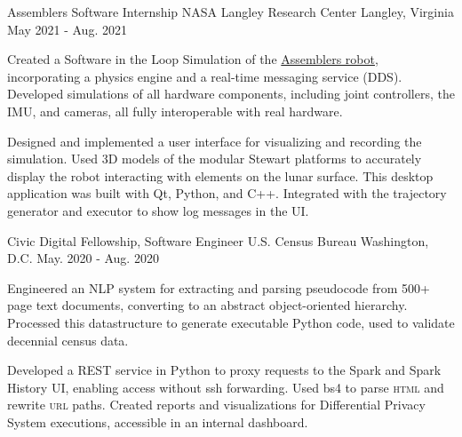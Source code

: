 

\begin{cventries}

  \cventry
  {Assemblers Software Internship} %
  {NASA Langley Research Center} %
  {Langley, Virginia} %
  {May 2021 - Aug. 2021} %
  {
    \begin{cvitems} %
      \item {Created a Software in the Loop Simulation of the \href{https://youtu.be/_9Bncie6AmM}{Assemblers robot}, incorporating a physics engine and a real-time messaging service (DDS). Developed simulations of all hardware components, including joint controllers, the IMU, and cameras, all fully interoperable with real hardware.}
      \item {Designed and implemented a user interface for visualizing and recording the simulation. Used 3D models of the modular Stewart platforms to accurately display the robot interacting with elements on the lunar surface. This desktop application was built with Qt, Python, and C++. Integrated with the trajectory generator and executor to show log messages in the UI.}
    \end{cvitems}
  }

  \cventry
  {Civic Digital Fellowship, Software Engineer} %
  {U.S. Census Bureau} %
  {Washington, D.C.} %
  {May. 2020 - Aug. 2020} %
  {
    \begin{cvitems} %
      \item {Engineered an NLP system for extracting and parsing pseudocode from 500+ page text documents, converting to an abstract object-oriented hierarchy. Processed this datastructure to generate executable Python code, used to validate decennial census data.}
      \item {Developed a REST service in Python to proxy requests to the Spark and Spark History UI, enabling access without ssh forwarding. Used bs4 to parse \textsc{html} and rewrite \textsc{url} paths. Created reports and visualizations for Differential Privacy System executions, accessible in an internal dashboard.}
    \end{cvitems}
  }


\end{cventries}
